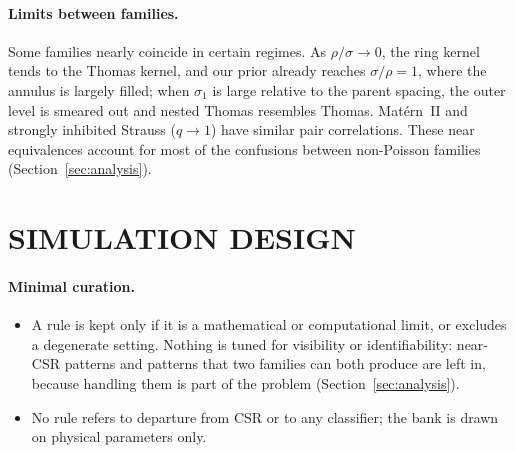 \paragraph{Limits between families.}
\label{app:families-limits}
Some families nearly coincide in certain regimes. As $\rho/\sigma\to0$, the ring kernel tends to the Thomas kernel, and our prior already reaches $\sigma/\rho=1$, where the annulus is largely filled; when
$\sigma_1$ is large relative to the parent spacing, the outer level is smeared out and nested Thomas resembles Thomas. Mat\'ern~II and strongly inhibited Strauss ($q\to1$) have similar pair correlations. These near equivalences account for most of the confusions between non-Poisson families (Section~\ref{sec:analysis}).

\section{SIMULATION DESIGN}
\label{app:data}

\paragraph{Minimal curation.}
\begin{itemize}
  \item A rule is kept only if it is a mathematical or computational limit, or excludes a degenerate setting.
        Nothing is tuned for visibility or identifiability: near-CSR patterns and patterns that two families can
        both produce are left in, because handling them is part of the problem (Section~\ref{sec:analysis}).
  \item No rule refers to departure from CSR or to any classifier; the bank is drawn on physical parameters only.
\end{itemize}


